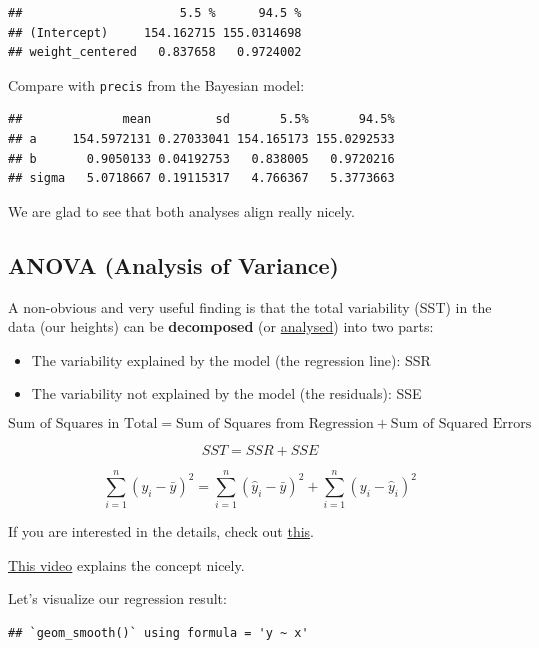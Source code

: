\documentclass[
]{book}
\providecommand{\tightlist}{%
  \setlength{\itemsep}{0pt}\setlength{\parskip}{0pt}}
\begin{document}
\begin{verbatim}
##                      5.5 %      94.5 %
## (Intercept)     154.162715 155.0314698
## weight_centered   0.837658   0.9724002
\end{verbatim}

Compare with \texttt{precis} from the Bayesian model:

\begin{verbatim}
##              mean         sd       5.5%       94.5%
## a     154.5972131 0.27033041 154.165173 155.0292533
## b       0.9050133 0.04192753   0.838005   0.9720216
## sigma   5.0718667 0.19115317   4.766367   5.3773663
\end{verbatim}

We are glad to see that both analyses align really nicely.

\subsection{ANOVA (Analysis of Variance)}\label{analysis_of_variance}

A non-obvious and very useful finding is that the total variability (SST)
in the data (our heights) can be
\textbf{decomposed} (or \href{https://en.wiktionary.org/wiki/analysis}{analysed})
into two parts:

\begin{itemize}
\tightlist
\item
  The variability explained by the model (the regression line): SSR
\item
  The variability not explained by the model (the residuals): SSE
\end{itemize}

\[ \text{Sum of Squares in Total} = \text{Sum of Squares from Regression} + \text{Sum of Squared Errors} \]

\[ SST = SSR + SSE \]

\[ \sum_{i=1}^{n} (y_i - \bar{y})^2 = \sum_{i=1}^{n} (\hat{y}_i - \bar{y})^2 + \sum_{i=1}^{n} (y_i - \hat{y}_i)^2 \]

If you are interested in the details, check out \href{https://en.wikipedia.org/wiki/Explained_sum_of_squares\#Partitioning_in_the_general_ordinary_least_squares_model}{this}.

\href{https://www.youtube.com/watch?v=NxRTs7sXKAQ&ab_channel=365DataScience}{This video}
explains the concept nicely.

Let's visualize our regression result:

\begin{verbatim}
## `geom_smooth()` using formula = 'y ~ x'
\end{verbatim}
\end{document}
